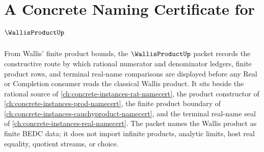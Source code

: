 \chapter{A Concrete Naming Certificate for $\WallisProductUp$}
\label{ch:concrete-instances-wallis-product-namecert}

From Wallis' finite product bounds, the $\WallisProductUp$ packet records the constructive route by which rational numerator and denominator ledgers, finite product rows, and terminal real-name comparisons are displayed before any Real or Completion consumer reads the classical Wallis product. It sits beside the rational source of \autoref{ch:concrete-instances-rat-namecert}, the product constructor of \autoref{ch:concrete-instances-prod-namecert}, the finite product boundary of \autoref{ch:concrete-instances-cauchyproduct-namecert}, and the terminal real-name seal of \autoref{ch:concrete-instances-real-namecert}. The packet names the Wallis product as finite BEDC data; it does not import infinite products, analytic limits, host real equality, quotient streams, or choice.

